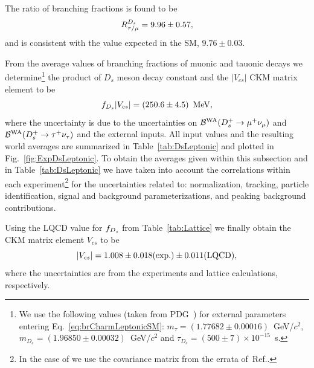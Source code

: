 The ratio of branching fractions is found to be
\begin{equation}
R_{\tau/\mu}^{D_{s}} = 9.96\pm0.57,
\label{eq:R:WA:Leptonic}
\end{equation}
and is consistent with the value expected in the SM, $9.76\pm0.03$.

From the average values of branching fractions of muonic and tauonic decays we determine\footnote{
We use the following values (taken from PDG~\cite{PDG_2012}) for external parameters entering 
Eq.~\ref{eq:brCharmLeptonicSM}: $m_{\tau} = (1.77682\pm0.00016)$~GeV/$c^2$, $m_{D_s} = (1.96850\pm0.00032)$~GeV/$c^2$ 
and $\tau_{D_s} = (500\pm7)\times 10^{-15}$~s.} the product of $D_s$ meson decay constant and 
the $|V_{cs}|$ CKM matrix element to be
\begin{equation}
 f_{D_s}|V_{cs}|=\left(250.6\pm4.5\right)~\mbox{MeV},
 \label{eq:expFDSVCS}
\end{equation}
where the uncertainty is due to the uncertainties on ${\cal B}^{\rm WA}(D_s^+\to\mu^+\nu_{\mu})$ and 
${\cal B}^{\rm WA}(D_s^+\to\tau^+\nu_{\tau})$ and the external inputs. All input values and the resulting world averages are 
summarized in Table~\ref{tab:DsLeptonic} and plotted in Fig.~\ref{fig:ExpDsLeptonic}. To obtain the 
averages given within this subsection and in Table~\ref{tab:DsLeptonic} we have taken into account
the correlations within each experiment\footnote{In the case of \babar we use the covariance matrix from 
the errata of~Ref.\cite{delAmoSanchez:2010jg}.} for the uncertainties related to: normalization, tracking, particle identification, 
signal and background parameterizations, and peaking background contributions.

Using the LQCD value for $f_{D_s}$ from Table~\ref{tab:Lattice} we 
finally obtain the CKM matrix element $V_{cs}$ to be
\begin{equation}
 |V_{cs}| = 1.008\pm0.018(\rm exp.)\pm0.011(\rm LQCD),
 \label{eq:Vcs:WA:Leptonic}
\end{equation}
where the uncertainties are from the experiments and lattice calculations, respectively.


